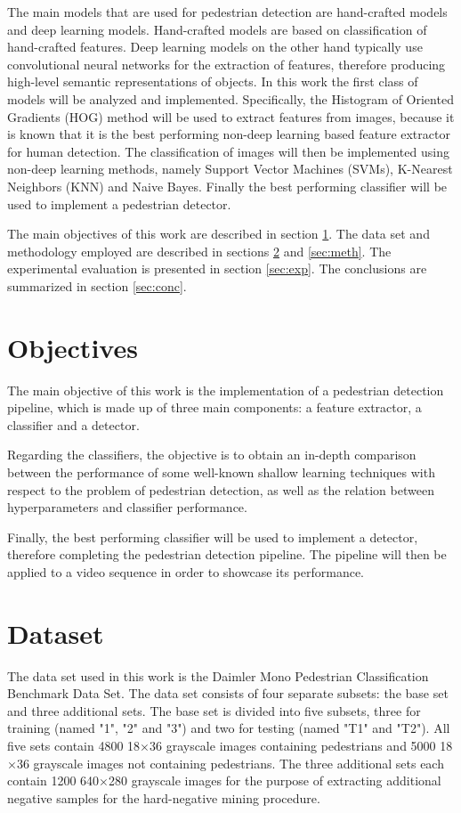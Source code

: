 \documentclass[journal,twocolumn]{IEEEtran}
\begin{document}
The main models that are used for pedestrian detection are
hand-crafted models and deep learning models. Hand-crafted
models are based on classification of hand-crafted features. Deep learning models on the other hand typically use
convolutional neural networks for the extraction of features,
therefore producing high-level semantic representations of
objects.
In this work the first class of models will be analyzed
and implemented. Specifically, the Histogram of Oriented
Gradients (HOG) method will be used to extract features from
images, because it is known\cite{2} that it is the best performing non-deep learning based feature extractor for human detection. The classification of images will then be implemented
using non-deep learning methods, namely Support Vector
Machines (SVMs), K-Nearest Neighbors (KNN) and Naive Bayes. Finally the best performing classifier will be used
to implement a pedestrian detector.

The main objectives of this work are described in section
\ref{sec:obj}. The data set and methodology employed are described in
sections \ref{sec:data} and \ref{sec:meth}. The experimental evaluation is presented
in section \ref{sec:exp}. The conclusions are summarized in section \ref{sec:conc}.

\section{Objectives}
\label{sec:obj}
The main objective of this work is the implementation of
a pedestrian detection pipeline, which is made up
of three main components: a feature extractor, a classifier and a
detector.

Regarding the classifiers, the objective is to obtain an in-depth comparison between the performance of some well-known shallow learning techniques with respect to the problem of pedestrian detection, as well as the relation between hyperparameters and classifier performance.

Finally, the best performing classifier will be used to implement a detector, therefore completing the pedestrian detection pipeline. The pipeline will then be applied to a video sequence in order to showcase its performance.

\section{Dataset}
\label{sec:data}

The data set used in this work is the Daimler Mono Pedestrian Classification Benchmark Data Set. The data set consists of four separate subsets: the base set and three additional sets. The base set is divided into five subsets, three for training (named "1", "2" and "3") and two for testing (named "T1" and "T2"). All five sets contain 4800 18$\times$36 grayscale images containing pedestrians and 5000 18$\times$36 grayscale images not containing pedestrians. The three additional sets each contain 1200 640$\times$280 grayscale images for the purpose of extracting additional negative samples for the hard-negative mining procedure.
\end{document}
